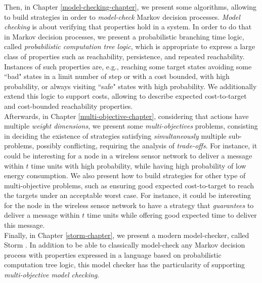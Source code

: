 Then, in Chapter \ref{model-checking-chapter}, we present some algorithms, allowing to build strategies in order to \textit{model-check} Markov decision processes.
\textit{Model checking} is about verifying that properties hold in a system.
In order to do that in Markov decision processes, we present a probabilistic branching time logic, called \textit{probabilistic computation tree logic}, which is appropriate to express a large class of properties such as reachability, persistence, and repeated reachability.
Instances of such properties are, e.g.,
reaching some target states avoiding some ``bad" states in a limit number of step or with a cost bounded, with high probability, or always visiting ``safe" states with high probability.
We additionally extend this logic to support costs, allowing to describe expected cost-to-target and cost-bounded reachability properties.\\

Afterwards, in Chapter \ref{multi-objective-chapter}, considering that actions have multiple \textit{weight dimensions},
we present some \textit{multi-objectives} problems, consisting in deciding the existence of strategies satisfying \textit{simultaneously} multiple sub-problems, possibly conflicting, requiring the analysis of \textit{trade-offs}.
For instance, it could be interesting for a node in a wireless sensor network to deliver a message within $t$ time units with high probability, while having high probability of low energy consumption.
We also present how to build strategies for other type of multi-objective problems, such as ensuring good expected cost-to-target to reach the targets under an acceptable worst case.
For instance, it could be interesting for the node in the wireless sensor network to have a strategy that \textit{guarantees} to deliver a message within $t$ time units while offering good expected time to deliver this message.\\

Finally, in Chapter \ref{storm-chapter}, we present a modern model-checker, called Storm \cite{storm1}.
In addition to be able to classically model-check any Markov decision process with properties expressed in a language based on probabilistic computation tree logic,
this model checker has the particularity of supporting \textit{multi-objective model checking}.
